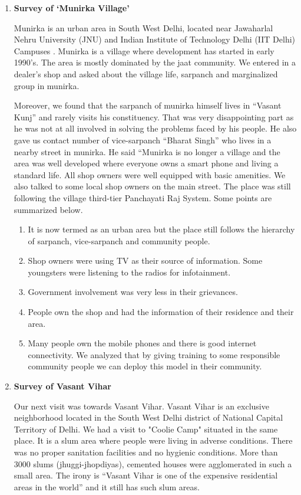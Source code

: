 \begin{enumerate}
\item \textbf {Survey of ‘Munirka Village’}

Munirka is an urban area in South West Delhi, located near Jawaharlal Nehru
University (JNU) and Indian Institute of Technology Delhi (IIT Delhi)
Campuses \cite{Munir91:online}. Munirka is a village where development has started in early 1990’s.
The area is mostly dominated by the jaat community. We entered in a dealer’s shop
and asked about the village life, sarpanch and marginalized group in munirka.

Moreover, we found that the sarpanch of munirka himself lives in “Vasant Kunj”
and rarely visits his constituency. That was very disappointing part as he was not
at all involved in solving the problems faced by his people. He also gave us contact
number of vice-sarpanch “Bharat Singh” who lives in a nearby street in munirka.
He said “Munirka is no longer a village and the area was well developed where
everyone owns a smart phone and living a standard life. All shop owners were well
equipped with basic amenities. We also talked to some local shop owners on the
main street. The place was still following the village third-tier Panchayati Raj
System. Some points are summarized below.

\begin{enumerate}
\item It is now termed as an urban area but the place still follows the hierarchy of
sarpanch, vice-sarpanch and community people.
\item Shop owners were using TV as their source of information. Some youngsters
were listening to the radios for infotainment.
\item Government involvement was very less in their grievances.
\item People own the shop and had the information of their residence and their
area.
\item Many people own the mobile phones and there is good internet connectivity. We analyzed that by giving training to some responsible community people we can deploy this model in their community.

\end{enumerate}

\item \textbf {Survey of Vasant Vihar}

Our next visit was towards Vasant Vihar. Vasant Vihar is an exclusive
neighborhood located in the South West Delhi district of National Capital Territory
of Delhi. We had a visit to "Coolie Camp" situated in the same place. It is a slum area
where people were living in adverse conditions. There was no proper sanitation
facilities and no hygienic conditions. More than 3000 slums (jhuggi-jhopdiyas), cemented houses were agglomerated in such a small area. The irony is “Vasant Vihar is one
of the expensive residential areas in the world”  and it
still has such slum areas.\\


\end{enumerate}
